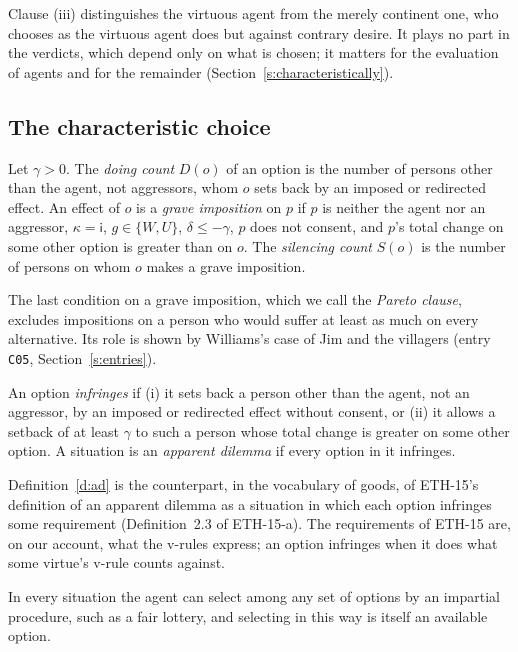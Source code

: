 \documentclass{situationist-preprint}
\begin{document}
Clause (iii) distinguishes the virtuous agent from the merely continent one, who chooses as the virtuous agent does but against contrary desire. It plays no part in the verdicts, which depend only on what is chosen; it matters for the evaluation of agents and for the remainder (Section~\ref{s:characteristically}).

\subsection{The characteristic choice}

\begin{definition}\label{d:silence}
Let $\gamma>0$. The \emph{doing count} $D(o)$ of an option is the number of persons other than the agent, not aggressors, whom $o$ sets back by an imposed or redirected effect. An effect of $o$ is a \emph{grave imposition} on $p$ if $p$ is neither the agent nor an aggressor, $\kappa=\mathsf{i}$, $g\in\{W,U\}$, $\delta\leq-\gamma$, $p$ does not consent, and $p$'s total change on some other option is greater than on $o$. The \emph{silencing count} $S(o)$ is the number of persons on whom $o$ makes a grave imposition.
\end{definition}

The last condition on a grave imposition, which we call the \emph{Pareto clause}, excludes impositions on a person who would suffer at least as much on every alternative. Its role is shown by Williams's case of Jim and the villagers (entry \texttt{C05}, Section~\ref{s:entries}).

\begin{definition}\label{d:ad}
An option \emph{infringes} if (i) it sets back a person other than the agent, not an aggressor, by an imposed or redirected effect without consent, or (ii) it allows a setback of at least $\gamma$ to such a person whose total change is greater on some other option. A situation is an \emph{apparent dilemma} if every option in it infringes.
\end{definition}

Definition~\ref{d:ad} is the counterpart, in the vocabulary of goods, of ETH-15's definition of an apparent dilemma as a situation in which each option infringes some requirement (Definition~2.3 of ETH-15-a). The requirements of ETH-15 are, on our account, what the v-rules express; an option infringes when it does what some virtue's v-rule counts against.

\begin{assumption}\label{a:lottery}
In every situation the agent can select among any set of options by an impartial procedure, such as a fair lottery, and selecting in this way is itself an available option.
\end{assumption}
\end{document}
